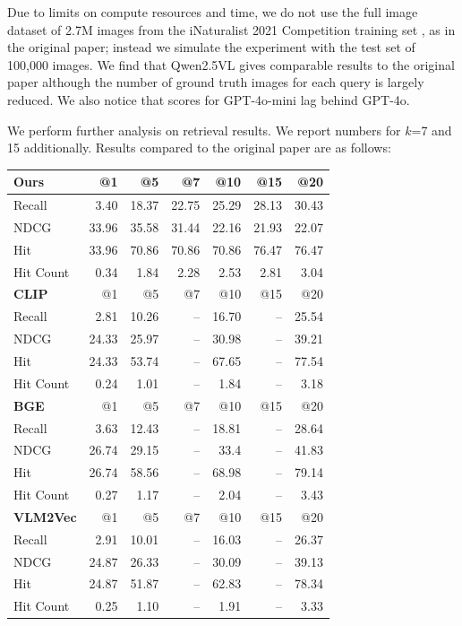 Due to limits on compute resources and time, we do not use the full image dataset of 2.7M images from the iNaturalist 2021 Competition training set \cite{Van_Horn_2021_CVPR},
as in the original paper; instead we simulate the experiment with the test set of 100,000 images.
We find that Qwen2.5VL gives comparable results to the original paper although the number of ground truth images for each query is largely reduced.
We also notice that scores for GPT-4o-mini lag behind GPT-4o.

We perform further analysis on retrieval results.
We report numbers for $k$=7 and 15 additionally.
Results compared to the original paper are as follows:
\begin{tabularx}{\textwidth}{ l | r r r r r r }
    \toprule
    \textbf{Ours} & @1 & @5 & @7 & @10 & @15 & @20 \\
    \midrule
    Recall & 3.40 & 18.37 & 22.75 & 25.29 & 28.13 & 30.43 \\
    NDCG & 33.96 & 35.58 & 31.44 & 22.16 & 21.93 & 22.07 \\
    Hit & 33.96 & 70.86 & 70.86 & 70.86 & 76.47 & 76.47 \\
    Hit Count & 0.34 & 1.84 & 2.28 & 2.53 & 2.81 & 3.04 \\
    \midrule
    \textbf{CLIP} & @1 & @5 & @7 & @10 & @15 & @20 \\
    \midrule
    Recall & 2.81 & 10.26 & -- & 16.70 & -- & 25.54 \\
    NDCG & 24.33 & 25.97 & -- & 30.98 & -- & 39.21 \\
    Hit & 24.33 & 53.74 & -- & 67.65 & -- & 77.54 \\
    Hit Count & 0.24 & 1.01 & -- & 1.84 & -- & 3.18 \\
    \midrule
    \textbf{BGE} & @1 & @5 & @7 & @10 & @15 & @20 \\
    \midrule
    Recall & 3.63 & 12.43 & -- & 18.81 & -- & 28.64 \\
    NDCG & 26.74 & 29.15 & -- & 33.4 & -- & 41.83 \\
    Hit & 26.74 & 58.56 & -- & 68.98 & -- & 79.14\\
    Hit Count & 0.27 & 1.17 & -- & 2.04 & -- & 3.43 \\
    \midrule
    \textbf{VLM2Vec} & @1 & @5 & @7 & @10 & @15 & @20 \\
    \midrule
    Recall & 2.91 & 10.01 & -- & 16.03 & -- & 26.37 \\
    NDCG & 24.87 & 26.33 & -- & 30.09 & -- & 39.13 \\
    Hit & 24.87 & 51.87 & -- & 62.83 & -- & 78.34 \\
    Hit Count & 0.25 & 1.10 & -- & 1.91 & -- & 3.33 \\
    \bottomrule
\end{tabularx}

